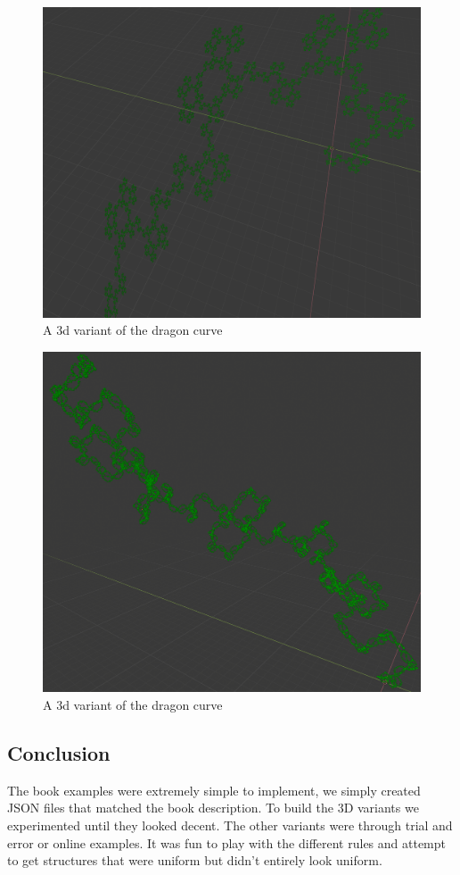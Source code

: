 \begin{figure}[h]
    \centering
    \includegraphics[width=\textwidth]{figures/L-systems/dragon2-3d.png}
    \caption{A 3d variant of the dragon curve}
\end{figure}

\begin{figure}[h]
    \centering
    \includegraphics[width=\textwidth]{figures/L-systems/dragon3-3d.png}
    \caption{A 3d variant of the dragon curve}
\end{figure}

\subsection{Conclusion}
The book examples were extremely simple to implement, we simply
created JSON files that matched the book description. To build the 3D
variants we experimented until they looked decent. The other variants were
through trial and error or online examples. It was fun to play with the
different rules and attempt to get structures that were uniform but didn't
entirely look uniform.
